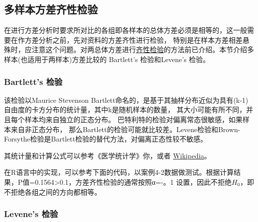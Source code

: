 \documentclass[
]{article}
\newenvironment{Shaded}{\begin{snugshade}}{\end{snugshade}}
\newcommand{\CommentTok}[1]{\textcolor[rgb]{0.56,0.35,0.01}{\textit{#1}}}
\newcommand{\KeywordTok}[1]{\textcolor[rgb]{0.13,0.29,0.53}{\textbf{#1}}}
\newcommand{\NormalTok}[1]{#1}
\newcommand{\OperatorTok}[1]{\textcolor[rgb]{0.81,0.36,0.00}{\textbf{#1}}}
\begin{document}
\hypertarget{ux591aux6837ux672cux65b9ux5deeux9f50ux6027ux68c0ux9a8c}{%
\subsection{多样本方差齐性检验}\label{ux591aux6837ux672cux65b9ux5deeux9f50ux6027ux68c0ux9a8c}}

在进行方差分析时要求所对比的各组即各样本的总体方差必须是相等的，这一般需要在作方差分析之前，先对资料的方差齐性进行检验，
特别是在样本方差相差悬殊时，应注意这个问题。对两总体方差进行\protect\hyperlink{ux4e24ux6837ux672cux65b9ux5deeux9f50ux6027ux68c0ux9a8c}{齐性检验}的方法前已介绍。本节介绍多样本(也适用于两样本)方差比较的
Bartlett's 检验和Levene's 检验。

\hypertarget{bartletts-ux68c0ux9a8c}{%
\subsubsection{Bartlett's 检验}\label{bartletts-ux68c0ux9a8c}}

该检验以Maurice Stevenson Bartlett命名的，是基于其抽样分布近似为具有(k-1)自由度的卡方分布的统计量，其中k是随机样本的数量，
其大小可能有所不同，并且每个样本均来自独立的正态分布。 巴特利特的检验对偏离常态很敏感，如果样本来自非正态分布，
那么Bartlett的检验可能就比较差。Levene检验和Brown-Forsythe检验是Bartlett检验的替代方法，对偏离正态性较不敏感。

其统计量和计算公式可以参考《医学统计学》你，或者 \href{https://en.wikipedia.org/wiki/Bartlett\%27s_test}{Wikipedia}。

在R语言中的实现，可以参考下面的代码，以案例4-2数据做测试。根据计算结果，P值=0.1564\textgreater0.1，方差齐性检验的通常按照α=-。1
设置，因此不拒绝\(H_0\)，即不拒绝各组之间的方向都相等。

\begin{Shaded}
\end{Shaded}

\hypertarget{levenes-ux68c0ux9a8c}{%
\subsubsection{Levene's 检验}\label{levenes-ux68c0ux9a8c}}
\end{document}
